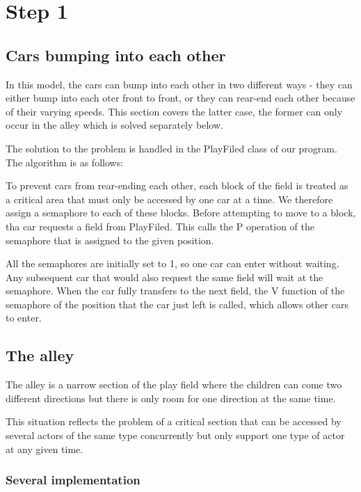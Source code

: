 


\section{Step 1}

\subsection{Cars bumping into each other}\label{section1} %

In this model, the cars can bump into each other in two different ways - they can either bump into each oter front to front, or they can rear-end each other because of their varying speeds. This section covers the latter case, the former can only occur in the alley which is solved separately below.

The solution to the problem is handled in the PlayFiled class of our program. The algorithm is as follows:

To prevent cars from rear-ending each other, each block of the field is treated as a critical area that must only be accessed by one car at a time. We therefore assign a semaphore to each of these blocks. Before attempting to move to a block, tha car requests a field from PlayFiled. This calls the P operation of the semaphore that is assigned to the given position. 

All the semaphores are initially set to 1, so one car can enter without waiting. Any subsequent car that would also request the same field will wait at the semaphore. When the car fully transfers to the next field, the V function of the semaphore of the position that the car just left is called, which allows other cars to enter.




\subsection{The alley} %

The alley is a narrow section of the play field where the children can come two
different directions but there is only room for one direction at the same time.

This situation reflects the problem of a critical section that can be accessed
by several actors of the same type concurrently but only support one type of
actor at any given time.

\subsubsection{Several implementation}

